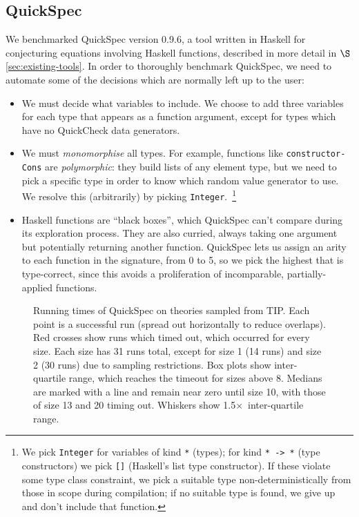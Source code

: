 \subsection{QuickSpec}

We benchmarked QuickSpec version 0.9.6, a tool written in Haskell for
conjecturing equations involving Haskell functions, described in more detail in
$\S$\ref{sec:existing-tools}. In order to thoroughly benchmark QuickSpec, we
need to automate some of the decisions which are normally left up to the user:

\begin{sloppypar}
  \begin{itemize}
  \item We must decide what variables to include. We choose to add three
    variables for each type that appears as a function argument, except for
    types which have no QuickCheck data generators.
  \item We must \emph{monomorphise} all types. For example, functions like
    \texttt{constructor-Cons} are \emph{polymorphic}: they build lists of any
    element type, but we need to pick a specific type in order to know which
    random value generator to use. We resolve this (arbitrarily) by picking
    \texttt{Integer}.~\footnote{We pick \texttt{Integer} for variables of kind
      \texttt{*} (types); for kind \texttt{* -> *} (type constructors) we pick
      \texttt{[]} (Haskell's list type constructor). If these violate some
      type class constraint, we pick a suitable type non-deterministically from
      those in scope during compilation; if no suitable type is found, we give
      up and don't include that function.}
  \item Haskell functions are ``black boxes'', which QuickSpec can't compare
    during its exploration process. They are also curried, always taking one
    argument but potentially returning another function. QuickSpec lets us
    assign an arity to each function in the signature, from 0 to 5, so we pick
    the highest that is type-correct, since this avoids a proliferation of
    incomparable, partially-applied functions.
  \end{itemize}
\end{sloppypar}

\begin{figure}
  \centering
  
  \caption{Running times of QuickSpec on theories sampled from TIP. Each point
    is a successful run (spread out horizontally to reduce overlaps). Red
    crosses show runs which timed out, which occurred for every size. Each size
    has 31 runs total, except for size 1 (14 runs) and size 2 (30 runs) due to
    sampling restrictions. Box plots show inter-quartile range, which reaches
    the timeout for sizes above 8. Medians are marked with a line and remain
    near zero until size 10, with those of size 13 and 20 timing out. Whiskers
    show 1.5$\times$~inter-quartile range.}
  \label{figure:quickspec_runtimes}
\end{figure}

